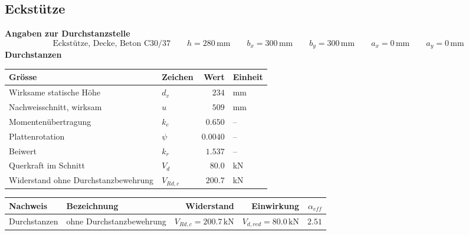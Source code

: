 \documentclass[11pt,a4paper]{article}
\begin{document}
\subsection{Eckstütze}
\noindent\textbf{Angaben zur Durchstanzstelle}
\begin{equation*}
\text{Eckstütze, Decke, Beton C30/37} \qquad h = 280\,\mathrm{mm} \qquad b_x = 300\,\mathrm{mm} \qquad b_y = 300\,\mathrm{mm} \qquad a_x = 0\,\mathrm{mm} \qquad a_y = 0\,\mathrm{mm}
\end{equation*}
\noindent\textbf{Durchstanzen}
\begin{longtable}{llrl}
\hline
Grösse & Zeichen & Wert & Einheit \\
\hline
\endhead
Wirksame statische Höhe & $d_v$ & $234$ & mm \\
Nachweisschnitt, wirksam & $u$ & $509$ & mm \\
Momentenübertragung & $k_e$ & $0.650$ & – \\
Plattenrotation & $\psi$ & $0.0040$ & – \\
Beiwert & $k_r$ & $1.537$ & – \\
Querkraft im Schnitt & $V_d$ & $80.0$ & kN \\
Widerstand ohne Durchstanzbewehrung & $V_{Rd,c}$ & $200.7$ & kN \\
\hline
\end{longtable}
\begin{xltabular}{\linewidth}{>{\raggedright\arraybackslash}X>{\raggedright\arraybackslash}Xrrr}
\hline
Nachweis & Bezeichnung & Widerstand & Einwirkung & $\alpha_{eff}$ \\
\hline
\endhead
Durchstanzen & ohne Durchstanzbewehrung & $V_{Rd,c} = 200.7\,\mathrm{kN}$ & $V_{d,red} = 80.0\,\mathrm{kN}$ & $2.51$ \\
\hline
\end{xltabular}
\end{document}
